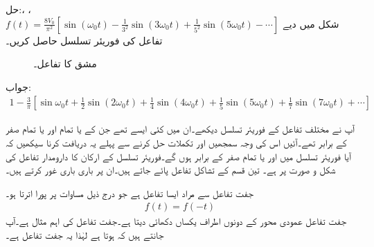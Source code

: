 حل:، ، \\
$f(t)=\tfrac{8V_0}{\pi^2}\left[\sin(\omega_0 t)-\tfrac{1}{3^2}\sin(3\omega_0 t)+\tfrac{1}{5^2}\sin(5\omega_0 t)-\cdots\right]$
شکل  میں دیے تفاعل کی فوریئر تسلسل حاصل کریں۔
\begin{figure}
\centering
{}
\caption{مشق  کا تفاعل۔}
\label{شکل_فوریئر_مختلف_تفاعل_مشق}
\end{figure}

جواب:
\begin{align*}
1-\tfrac{3}{\pi}\left[\sin \omega_0 t+\tfrac{1}{2}\sin (2\omega_0 t)+\tfrac{1}{4}\sin(4\omega_0 t)+\tfrac{1}{5}\sin(5\omega_0 t)+\tfrac{1}{7}\sin(7\omega_0 t)+\cdots\right]
\end{align*}

آپ نے مختلف تفاعل کے فوریئر تسلسل دیکھے۔ان میں کئی ایسے تھے جن کے یا تمام  اور یا تمام  صفر کے برابر تھے۔آئیں اس کی وجہ سمجھیں اور تکملات حل کرنے سے پہلے یہ دریافت کرنا سیکھیں کہ آیا فوریئر تسلسل میں  اور یا تمام  صفر کے برابر ہوں گے۔فوریئر تسلسل کے ارکان کا دارومدار تفاعل کی شکل و صورت پر ہے۔ تین قسم کے تشاکل تفاعل پائے جاتے ہیں۔ان پر باری باری غور کرتے ہیں۔

جفت تفاعل سے مراد ایسا تفاعل ہے جو درج ذیل مساوات پر پورا اترتا ہو۔
\begin{align}
f(t)=f(-t)
\end{align}
جفت  تفاعل عمودی محور کے دونوں اطراف یکساں دکھائی دیتا ہے۔جفت تفاعل کی اہم مثال  ہے۔آپ جانتے ہیں کہ  ہوتا ہے لہٰذا یہ جفت تفاعل ہے۔

